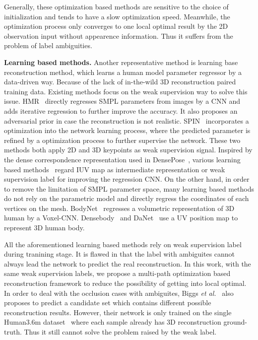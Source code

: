 \documentclass[sigconf]{acmart}
\begin{document}
Generally, these optimization based methods are sensitive to the choice of initialization and tends to have a slow optimization speed. 
Meanwhile, the optimization process only converges to one local optimal result by the 2D observation input without appearence information. 
Thus it suffers from the problem of label ambiguities.

\textbf{Learning based methods. }
Another representative method is learning base reconstruction method, which learns a human model parameter regressor by a data-driven way. 
Because of the lack of in-the-wild 3D reconstruction paired training data. Existing methods focus on the weak supervision way to solve this 
issue. HMR~\cite{kanazawa2018end} directly regresses SMPL parameters from images by a CNN and 
adds iterative regression to further improve the accuracy. 
It also proposes an adversarial prior in case the reconstruction is not realistic. SPIN~\cite{kolotouros2019learning} incorporates a 
optimization into the network learning process, where the predicted parameter is refined by a optimization process to further 
supervise the network. These two methods both apply 2D and 3D keypoints as weak supervision signal.  
Inspired by the dense correspondence representation used in DensePose~\cite{guler2018densepose}, various 
learning based methods~\cite{guler2019holopose, rong2019delving} regard IUV map as intermediate 
representation or weak supervision label for improving the regression CNN. 
On the other hand, in order to remove the limitation of SMPL parameter space, many learning based methods do not rely on the parametric 
model and directly regress the coordinates of each vertices on the mesh.  BodyNet~\cite{varol2018bodynet} regresses a 
volumetric representation of 3D human by a Voxel-CNN. Densebody~\cite{yao2019densebody} and DaNet~\cite{zhang2019danet} use a UV position 
map to represent 3D human body. 

All the aforementioned learning based methods rely on weak supervision label during tranining stage. It is flawed in that the label 
with ambiguites cannot always lead the network to predict the real reconstruction. In this work, with the same weak supervision labels,  
we propose a multi-path optimization based reconstruction framework to reduce the possibility of getting into local optimal. 
In order to deal with the occlusion cases with ambiguites, Biggs \textit{et al.}~\cite{biggs20203d} also proposes to predict a candidate set which contains different possible reconstruction results. However, their network is only trained on the single Human3.6m dataset~\cite{ionescu2013human3} 
where each sample already has 3D reconstruction ground-truth. Thus it still cannot solve the problem raised by the weak label. 
\end{document}
